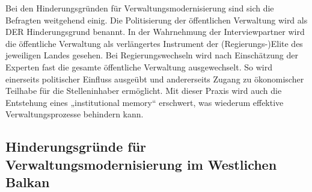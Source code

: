 Bei den Hinderungsgründen für Verwaltungsmodernisierung sind sich die Befragten weitgehend einig. Die Politisierung der öffentlichen Verwaltung wird als DER Hinderungsgrund benannt. In der Wahrnehmung der Interviewpartner wird die öffentliche Verwaltung als verlängertes Instrument der (Regierungs-)Elite des jeweiligen Landes gesehen. Bei Regierungswechseln wird nach Einschätzung der Experten fast die gesamte öffentliche Verwaltung ausgewechselt. So wird einerseits politischer Einfluss ausgeübt und andererseits Zugang zu ökonomischer Teilhabe für die Stelleninhaber ermöglicht. Mit dieser Praxis wird auch die Entstehung eines „institutional memory“ erschwert, was wiederum effektive Verwaltungsprozesse behindern kann.
\subsection{Hinderungsgründe für Verwaltungsmodernisierung im Westlichen Balkan}

